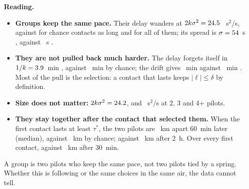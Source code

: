 \begin{reading}
\textbf{Reading.}
\begin{itemize}
  \item \textbf{Groups keep the same pace.} Their delay wanders at $2k\sigma^2=24.5$ \StQRealBand~s$^2$/s, against
        \StQChanceLong{} \StQChanceLongBand{} for chance contacts as long and \StQChance{} \StQChanceBand{} for all of them; its
        spread is $\sigma=54$~s \StSigmaRealBand, against \StSigmaChance~s \StSigmaChanceBand.
  \item \textbf{They are not pulled back much harder.} The delay forgets itself in $1/k=3.9$~min \StOuRealBand, against
        \StOuChance~min \StOuChanceBand{} by chance; the drift gives \StDriftReal~min \StDriftRealBand{} against \StDriftChance~min
        \StDriftChanceBand. Most of the pull is the selection: a contact that lasts keeps $|\ell|\le\delta$ by definition.
  \item \textbf{Size does not matter:} $2k\sigma^2=24.2$, \StQThree{} and \StQFour~s$^2$/s at 2, 3 and 4+ pilots.
  \item \textbf{They stay together after the contact that selected them.} When the first contact lasts at least $\tau^*$,
        the two pilots are \StSepRealLongSixty~km apart 60~min later (median), against \StSepChanceLongSixty~km by chance;
        \StSepRealLongTwoHours{} against \StSepChanceLongTwoHours~km after 2~h. Over every first contact, \StSepRealThirty{} against
        \StSepChanceThirty~km after 30~min.
\end{itemize}
A group is two pilots who keep the same pace, not two pilots tied by a spring. Whether this is following
or the same choices in the same air, the data cannot tell.
\end{reading}

